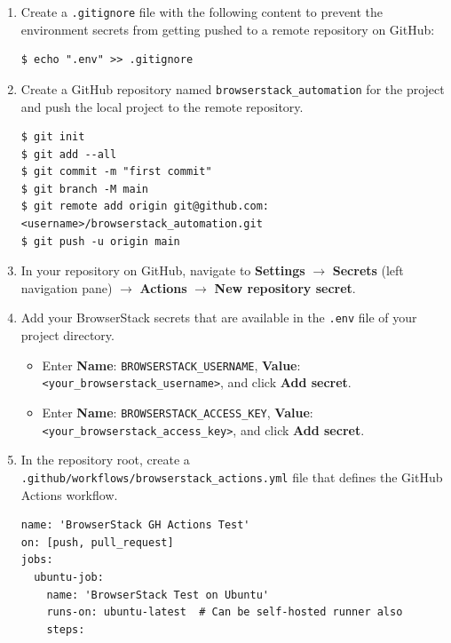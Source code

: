 \documentclass{article}
\begin{document}
\begin{enumerate}
    \item Create a \texttt{.gitignore} file with the following content to prevent the environment secrets from getting pushed to a remote repository on GitHub:

\begin{lstlisting}[style=bash]
$ echo ".env" >> .gitignore
\end{lstlisting}

    \item Create a GitHub repository named \texttt{browserstack\_automation} for the project and push the local project to the remote repository.

\begin{lstlisting}[style=bash]
$ git init
$ git add --all
$ git commit -m "first commit"
$ git branch -M main
$ git remote add origin git@github.com:<username>/browserstack_automation.git
$ git push -u origin main
\end{lstlisting}

    \item In your repository on GitHub, navigate to \textbf{Settings} $\rightarrow$ \textbf{Secrets} (left navigation pane) $\rightarrow$ \textbf{Actions} $\rightarrow$ \textbf{New repository secret}.
    
    \item Add your BrowserStack secrets that are available in the \texttt{.env} file of your project directory.
    \begin{itemize}
        \item Enter \textbf{Name}: \texttt{BROWSERSTACK\_USERNAME}, \textbf{Value}: \texttt{<your\_browserstack\_username>}, and click \textbf{Add secret}.
        \item Enter \textbf{Name}: \texttt{BROWSERSTACK\_ACCESS\_KEY}, \textbf{Value}: \texttt{<your\_browserstack\_access\_key>}, and click \textbf{Add secret}.
    \end{itemize}
    
    \item In the repository root, create a \texttt{.github/workflows/browserstack\_actions.yml} file that defines the GitHub Actions workflow.

\begin{lstlisting}[style=yaml]
name: 'BrowserStack GH Actions Test'
on: [push, pull_request]
jobs:
  ubuntu-job:
    name: 'BrowserStack Test on Ubuntu'
    runs-on: ubuntu-latest  # Can be self-hosted runner also
    steps:


\end{lstlisting}
\end{enumerate}
\end{document}
